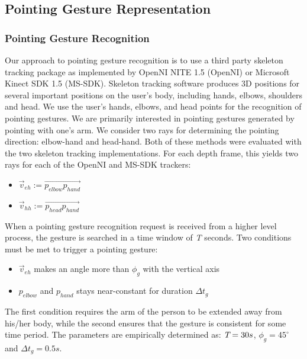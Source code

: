\subsection{Pointing Gesture Representation}

\subsubsection{Pointing Gesture Recognition}
\label{sec:pointing_pointing_gesture_recognition}

Our approach to pointing gesture recognition is to use a third party skeleton tracking package as implemented by OpenNI NITE 1.5 (OpenNI) or Microsoft Kinect SDK 1.5 (MS-SDK). Skeleton tracking software produces 3D positions for several important positions on the user's body, including hands, elbows, shoulders and head. We use the user's hands, elbows, and head points for the recognition of pointing gestures. We are primarily interested in pointing gestures generated by pointing with one's arm. We consider two rays for determining the pointing direction: elbow-hand and head-hand. Both of these methods were evaluated with the two skeleton tracking implementations. For each depth frame, this yields two rays for each of the OpenNI and MS-SDK trackers:

\begin{itemize}
\item{$\vec{v}_{eh} := \vec{p_{elbow}p_{hand}}$}
\item{$\vec{v}_{hh} := \vec{p_{head}p_{hand}}$}
\end{itemize}


When a pointing gesture recognition request is received from a higher level process, the gesture is searched in a time window of \emph{T} seconds. Two conditions must be met to trigger a pointing gesture:

\begin{itemize}
  \item $\vec{v}_{eh}$ makes an angle more than $\phi_{g}$ with the vertical axis
  \item $p_{elbow}$ and $p_{hand}$ stays near-constant for duration $\Delta t_{g}$
\end{itemize}

The first condition requires the arm of the person to be extended away from his/her body, while the second ensures that the gesture is consistent for some time period. The parameters are empirically determined as: $\emph{T}=30s$, $\phi_{g}=45^{\circ}$ and $\Delta t_{g}=0.5s$.

